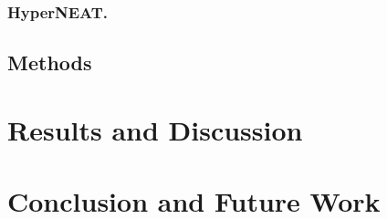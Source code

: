 \documentclass{llncs}
\begin{document}
\subsubsection{HyperNEAT.}

\subsection{Methods}

%
%
\section{Results and Discussion}

%
%
\section{Conclusion and Future Work}

%
%

%
\footnotesize


%
%
\end{document}
